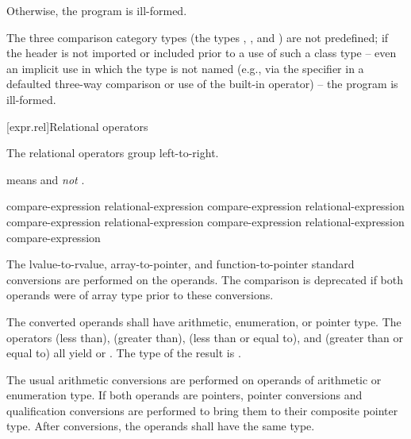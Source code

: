 \pnum
Otherwise, the program is ill-formed.

\pnum
The three comparison category types
(the types
,
, and
)
are not predefined;
if the header 
is not imported or included prior to a use of such a class type --
even an implicit use in which the type is not named
(e.g., via the  specifier
in a defaulted three-way comparison
or use of the built-in operator) -- the program is ill-formed.

[expr.rel]{Relational operators}%
%

\pnum
The relational operators group left-to-right.
\begin{example}
 means  and \emph{not}
.
\end{example}
%
%
%
%
%
%
%
%
%
\begin{bnf}
\br
    compare-expression\br
    relational-expression \terminal{<} compare-expression\br
    relational-expression \terminal{>} compare-expression\br
    relational-expression \terminal{<=} compare-expression\br
    relational-expression \terminal{>=} compare-expression
\end{bnf}
%
The
lvalue-to-rvalue,
array-to-pointer,
and function-to-pointer
standard conversions are performed on the operands.
The comparison is deprecated if
both operands were of array type
prior to these conversions.

\pnum
The converted operands shall have arithmetic, enumeration, or pointer type.
The
operators \tcode{<} (less than), \tcode{>} (greater than), \tcode{<=}
(less than or equal to), and \tcode{>=} (greater than or equal to) all
yield  or . The type of the result is
.

\pnum
The usual arithmetic conversions are performed on operands of arithmetic
or enumeration type. If both operands are pointers, pointer
conversions and qualification conversions
are performed to bring
them to their composite pointer type.
After conversions, the operands shall have the same type.

